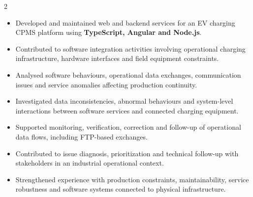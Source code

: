 \documentclass[8pt,a4paper,ragged2e,withhyper]{altacv}
\begin{document}



\makecvheader

\vspace{-0.3cm}


\begin{paracol}{2}



\begin{itemize}
\item Developed and maintained web and backend services for an EV charging CPMS platform using \textbf{TypeScript, Angular and Node.js}.
\item Contributed to software integration activities involving operational charging infrastructure, hardware interfaces and field equipment constraints.
\item Analysed software behaviours, operational data exchanges, communication issues and service anomalies affecting production continuity.
\item Investigated data inconsistencies, abnormal behaviours and system-level interactions between software services and connected charging equipment.
\item Supported monitoring, verification, correction and follow-up of operational data flows, including FTP-based exchanges.
\item Contributed to issue diagnosis, prioritization and technical follow-up with stakeholders in an industrial operational context.
\item Strengthened experience with production constraints, maintainability, service robustness and software systems connected to physical infrastructure.
\end{itemize}

\divider


\end{paracol}
\end{document}

